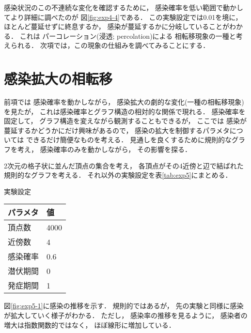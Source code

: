 \documentclass[10pt,oneside]{scrartcl}
\begin{document}
\begin{figure*}%
  \centering
\end{figure*}

感染状況のこの不連続な変化を確認するために，
感染確率を低い範囲で動かしてより詳細に調べたのが
図\ref{fig:exp4-4}である．
この実験設定では0.01を境に，
ほとんど蔓延せずに終息するか，
感染が蔓延するかに分岐していることがわかる．
これは
パーコレーション(浸透; percolation)による
相転移現象の一種と考えられる．
次項では，この現象の仕組みを調べてみることにする．

\section{感染拡大の相転移}
\label{sec:orge51cdcf}

前項では
感染確率を動かしながら，
感染拡大の劇的な変化(一種の相転移現象)を見たが，
これは感染確率とグラフ構造の相対的な関係で現れる．
感染確率を固定して，
グラフ構造を変えながら観測することもできるが，
ここでは
感染が蔓延するかどうかにだけ興味があるので，
感染の拡大を制御するパラメタについては
できるだけ簡便なものを考える．
見通しを良くするために規則的なグラフを考え，
感染確率のみを動かしながら，
その影響を探る．

2次元の格子状に並んだ頂点の集合を考え，
各頂点がその4近傍と辺で結ばれた規則的なグラフを考える．
それ以外の実験設定を表\ref{tab:exp5}にまとめる．

\begin{margintable}
  \caption{実験設定}
  \label{tab:exp5}
  \small
  \begin{tabular}{ll}
    \toprule
    パラメタ&値 \\
    \midrule
    頂点数&4000 \\
    近傍数&4 \\
    感染確率&0.6 \\
    潜伏期間&0 \\
    発症期間&1 \\
    \bottomrule
  \end{tabular}
\end{margintable}

図\ref{fig:exp5-1}に感染の推移を示す．
規則的ではあるが，
先の実験と同様に感染が拡大していく様子がわかる．
ただし，
感染率の推移を見るように，
感染者の増大は指数関数的ではなく，
ほぼ線形に増加している．
\end{document}
